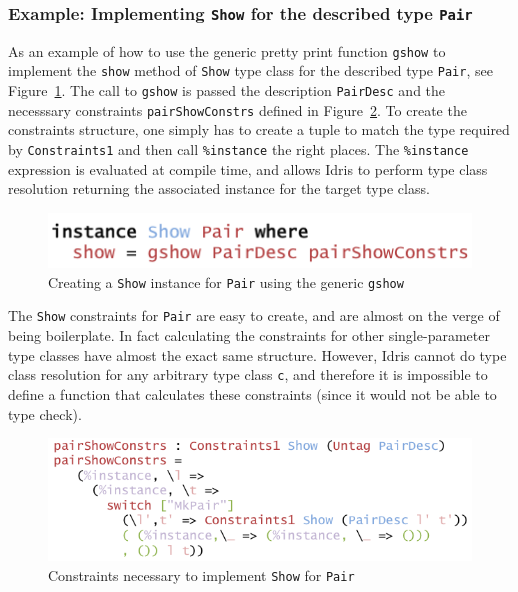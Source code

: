\documentclass{ituthesis}
\newcommand{\tttype}[1]{\textcolor{type-color}{\texttt{#1}}}
\newcommand{\ttdec}[1]{\textcolor{declared-var-color}{\texttt{#1}}}
\newcommand{\ttvar}[1]{\textcolor{local-var-color}{\texttt{#1}}}
\newcommand{\ttliteral}[1]{\textcolor{literal-color}{\texttt{#1}}}
\theoremstyle{break}
\begin{document}
\subsubsection{Example: Implementing \tttype{Show} for the described type \ttdec{Pair}}
\label{ssub:Example:ImplementingShowforPairs}
As an example of how to use the generic pretty print function \ttdec{gshow} to implement the \ttdec{show} method of \tttype{Show} type class for the described type \ttdec{Pair}, see Figure~\ref{fig:showinst}.
The call to \ttdec{gshow} is passed the description \ttdec{PairDesc} and the necesssary constraints \ttdec{pairShowConstrs} defined in Figure~\ref{fig:showconstrs}.
To create the constraints structure, one simply has to create a tuple to match the type required by \ttdec{Constraints1} and then call \ttliteral{\%instance} the right places.
The \ttliteral{\%instance} expression is evaluated at compile time, and allows Idris to perform type class resolution returning the associated instance for the target type class.

\begin{figure}[ht]
\begin{center}
    \includegraphics[scale=0.5]{Figures/GenericShowInstance.png}
\end{center}
\caption{Creating a \tttype{Show} instance for \ttdec{Pair} using the generic \ttdec{gshow}}
\label{fig:showinst}
\end{figure}

The \tttype{Show} constraints for \ttdec{Pair} are easy to create, and are almost on the verge of being boilerplate.
In fact calculating the constraints for other single-parameter type classes have almost the exact same structure.
However, Idris cannot do type class resolution for any arbitrary type class \ttvar{c}, and therefore it is impossible to define a function that calculates these constraints (since it would not be able to type check).

\begin{figure}[ht]
\begin{center}
    \includegraphics[scale=0.5]{Figures/GenericShowConstraints.png}
\end{center}
\caption{Constraints necessary to implement \tttype{Show} for \ttdec{Pair}}
\label{fig:showconstrs}
\end{figure}
\end{document}
